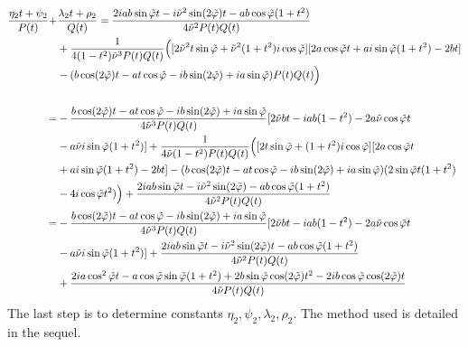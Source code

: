 \begin{equation}
\begin{split}
\frac{\eta_2 t+\psi_2}{P(t)}+&\frac{\lambda_2 t +\rho_2}{Q(t)}
=\frac{2iab\sin\tilde{\varphi}t-i\tilde{\nu}^2\sin(2\tilde{\varphi})t-ab\cos\tilde{\varphi}(1+t^2)}{4\tilde{\nu}^2P(t)Q(t)}\\
&+\frac{1}{4(1-t^2)\tilde{\nu}^3P(t)Q(t)}\Big( \lbrack 2\tilde{\nu}^2t\sin\tilde{\varphi}+\tilde{\nu}^2(1+t^2)i\cos\tilde{\varphi} \rbrack\lbrack2a\cos\tilde{\varphi}t+ai\sin\tilde{\varphi}(1+t^2)-2bt \rbrack\\
&-(b\cos(2\tilde{\varphi})t-at\cos\tilde{\varphi}-ib\sin(2\tilde{\varphi})+ia\sin\tilde{\varphi})P(t)Q(t)\Big) \\
~\\
=&-\frac{b\cos(2\tilde{\varphi})t-at\cos\tilde{\varphi}-ib\sin(2\tilde{\varphi})+ia\sin\tilde{\varphi}}{4\tilde{\nu}^3P(t)Q(t)}\lbrack 2\tilde{\nu} bt-iab(1-t^2)-2a\tilde{\nu}\cos\tilde{\varphi}t\\
&-a\tilde{\nu} i\sin\tilde{\varphi}(1+t^2)\rbrack +\frac{1}{4\tilde{\nu}(1-t^2)P(t)Q(t)}\Big( \lbrack 2t\sin\tilde{\varphi}+(1+t^2)i\cos\tilde{\varphi} \rbrack\lbrack 2a\cos\tilde{\varphi}t\\
&+ai\sin\tilde{\varphi}(1+t^2)-2bt \rbrack- (b\cos(2\tilde{\varphi})t-at\cos\tilde{\varphi}-ib\sin(2\tilde{\varphi})+ia\sin\tilde{\varphi})(2\sin\tilde{\varphi}t(1+t^2)\\
&-4i\cos\tilde{\varphi}t^2) \Big)+\frac{2iab\sin\tilde{\varphi}t-i\tilde{\nu}^2\sin(2\tilde{\varphi})-ab\cos\tilde{\varphi}(1+t^2)}{4\tilde{\nu}^2P(t)Q(t)}\\
=&-\frac{b\cos(2\tilde{\varphi})t-at\cos\tilde{\varphi}-ib\sin(2\tilde{\varphi})+ia\sin\tilde{\varphi}}{4\tilde{\nu}^3P(t)Q(t)}\lbrack 2\tilde{\nu} bt-iab(1-t^2)-2a\tilde{\nu}\cos\tilde{\varphi}t\\
&-a\tilde{\nu} i\sin\tilde{\varphi}(1+t^2)\rbrack+\frac{2iab\sin\tilde{\varphi}t-i\tilde{\nu}^2\sin(2\tilde{\varphi})t-ab\cos\tilde{\varphi}(1+t^2)}{4\tilde{\nu}^2P(t)Q(t)}\\
&+\frac{2ia\cos^2\tilde{\varphi}t-a\cos\tilde{\varphi}\sin\tilde{\varphi}(1+t^2)+2b\sin\tilde{\varphi}\cos(2\tilde{\varphi})t^2-2ib\cos\tilde{\varphi}\cos(2\tilde{\varphi})t}{4\tilde{\nu} P(t)Q(t)}
\end{split}
\label{N2}
\end{equation}
The last step is to determine constants $\eta_2,\psi_2,\lambda_2,\rho_2$. The method used is detailed in the sequel.

